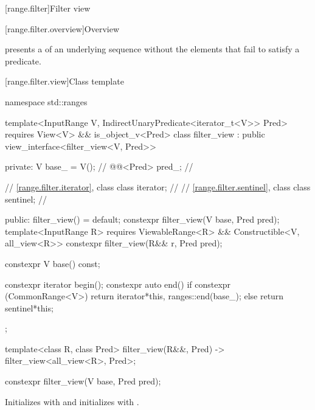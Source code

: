 [range.filter]{Filter view}

[range.filter.overview]{Overview}

\pnum
{} presents a  of an underlying sequence
without the elements that fail to satisfy a predicate.

\pnum
\begin{example}
\end{example}

[range.filter.view]{Class template }

\begin{codeblock}
namespace std::ranges {
  template<InputRange V, IndirectUnaryPredicate<iterator_t<V>> Pred>
    requires View<V> && is_object_v<Pred>
  class filter_view : public view_interface<filter_view<V, Pred>> {
  private:
    V base_ = V();                // \expos
    @@<Pred> pred_;  // \expos

    // \ref{range.filter.iterator}, class 
    class iterator;               // \expos
    // \ref{range.filter.sentinel}, class 
    class sentinel;               // \expos

  public:
    filter_view() = default;
    constexpr filter_view(V base, Pred pred);
    template<InputRange R>
      requires ViewableRange<R> && Constructible<V, all_view<R>>
    constexpr filter_view(R&& r, Pred pred);

    constexpr V base() const;

    constexpr iterator begin();
    constexpr auto end() {
      if constexpr (CommonRange<V>)
        return iterator{*this, ranges::end(base_)};
      else
        return sentinel{*this};
    }
  };

  template<class R, class Pred>
    filter_view(R&&, Pred) -> filter_view<all_view<R>, Pred>;
}
\end{codeblock}

%
\begin{itemdecl}
constexpr filter_view(V base, Pred pred);
\end{itemdecl}

\begin{itemdescr}
\pnum
\effects Initializes  with  and initializes
 with .
\end{itemdescr}

